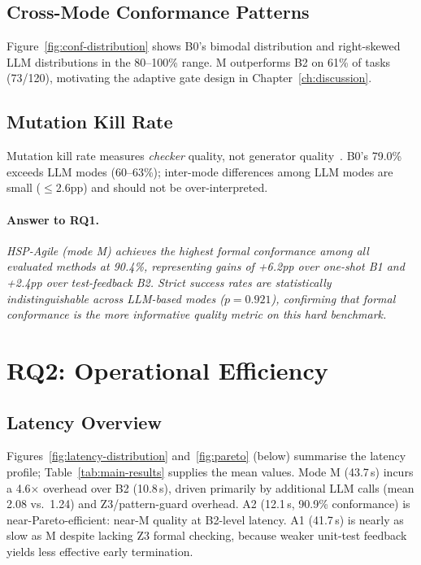 \subsection{Cross-Mode Conformance Patterns}

Figure~\ref{fig:conf-distribution} shows B0's bimodal distribution and right-skewed
LLM distributions in the 80--100\% range.  M outperforms B2 on 61\% of tasks (73/120),
motivating the adaptive gate design in Chapter~\ref{ch:discussion}.

\subsection{Mutation Kill Rate}

Mutation kill rate measures \emph{checker} quality, not generator quality~\citep{offutt1992mutation}.
B0's 79.0\% exceeds LLM modes (60--63\%); inter-mode differences among LLM modes are
small ($\le$2.6pp) and should not be over-interpreted.

\paragraph{Answer to RQ1.}
\emph{HSP-Agile (mode M) achieves the highest formal conformance among all evaluated
methods at 90.4\%, representing gains of +6.2pp over one-shot B1 and +2.4pp over
test-feedback B2.  Strict success rates are statistically indistinguishable across
LLM-based modes ($p = 0.921$), confirming that formal conformance is the more
informative quality metric on this hard benchmark.}

\section{RQ2: Operational Efficiency}
\label{sec:exp:rq2}

\subsection{Latency Overview}

Figures~\ref{fig:latency-distribution} and~\ref{fig:pareto} (below) summarise the
latency profile; Table~\ref{tab:main-results} supplies the mean values.  Mode M
(43.7\,s) incurs a 4.6$\times$ overhead over B2 (10.8\,s), driven primarily by
additional LLM calls (mean 2.08 vs.\ 1.24) and Z3/pattern-guard overhead.  A2
(12.1\,s, 90.9\% conformance) is near-Pareto-efficient: near-M quality at B2-level
latency.  A1 (41.7\,s) is nearly as slow as M despite lacking Z3 formal checking,
because weaker unit-test feedback yields less effective early termination.

